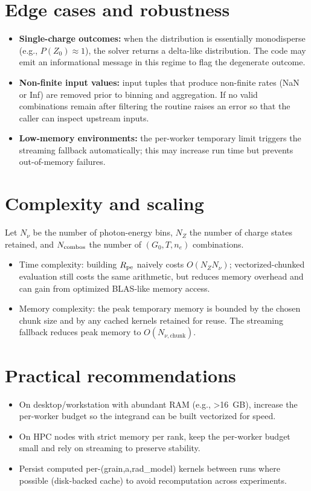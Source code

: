 \documentclass{article}
\begin{document}
\section{Edge cases and robustness}
\begin{itemize}
  \item \textbf{Single-charge outcomes:} when the distribution is essentially
    monodisperse (e.g., $P(Z_0)\approx 1$), the solver returns a delta-like
    distribution. The code may emit an informational message in this regime to
    flag the degenerate outcome.
  \item \textbf{Non-finite input values:} input tuples that produce
    non-finite rates (NaN or Inf) are removed prior to binning and aggregation.
    If no valid combinations remain after filtering the routine raises an
    error so that the caller can inspect upstream inputs.
  \item \textbf{Low-memory environments:} the per-worker temporary limit
    triggers the streaming fallback automatically; this may increase run time
    but prevents out-of-memory failures.
\end{itemize}

\section{Complexity and scaling}
Let $N_{\nu}$ be the number of photon-energy bins, $N_Z$ the number of charge
states retained, and $N_{\rm combos}$ the number of $(G_0,T,n_e)$ combinations.

\begin{itemize}
  \item Time complexity: building $R_{\rm pe}$ naively costs $O(N_Z N_{\nu})$;
    vectorized-chunked evaluation still costs the same arithmetic, but reduces
    memory overhead and can gain from optimized BLAS-like memory access.
  \item Memory complexity: the peak temporary memory is bounded by the chosen
    chunk size and by any cached kernels retained for reuse. The streaming
    fallback reduces peak memory to $O(N_{\nu,\text{chunk}})$.
\end{itemize}

\section{Practical recommendations}
\begin{itemize}
  \item On desktop/workstation with abundant RAM (e.g., >16~GB), increase the
    per-worker budget so the integrand can be built vectorized for speed.
  \item On HPC nodes with strict memory per rank, keep the per-worker budget
    small and rely on streaming to preserve stability.
  \item Persist computed per-(grain,a,rad_model) kernels between runs where
    possible (disk-backed cache) to avoid recomputation across experiments.
\end{itemize}
\end{document}
